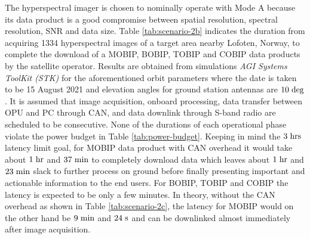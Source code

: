The hyperspectral imager is chosen to nominally operate with Mode A because its data product is a good compromise between spatial resolution, spectral resolution, SNR and data size. Table \ref{tab:scenario-2b} indicates the duration from acquiring 1334 hyperspectral images of a target area nearby Lofoten, Norway, to complete the download of a MOBIP, BOBIP, TOBIP and COBIP data products by the satellite operator. Results are obtained from simulations \emph{AGI Systems ToolKit (STK)} for the aforementioned orbit parameters where the date is taken to be 15 August 2021 and elevation angles for ground station antennas are $10 \hspace{3pt} \rm{deg}$. It is assumed that image acquisition, onboard processing, data transfer between OPU and PC through CAN, and data downlink through S-band radio are scheduled to be consecutive. None of the durations of each operational phase violate the power budget in Table \ref{tab:power-budget}. Keeping in mind the $3 \hspace{3pt} \rm{hrs}$ latency limit goal, for MOBIP data product with CAN overhead it would take about $1 \hspace{3pt} \rm{hr}$ and $37 \hspace{3pt} \rm{min}$ to completely download data which leaves about $1 \hspace{3pt} \rm{hr}$ and $23 \hspace{3pt} \rm{min}$ slack to further process on ground before finally presenting important and actionable information to the end users. For BOBIP, TOBIP and COBIP the latency is expected to be only a few minutes. In theory, without the CAN overhead as shown in Table \ref{tab:scenario-2c}, the latency for MOBIP would on the other hand be $9 \hspace{3pt} \rm{min}$ and $24 \hspace{3pt} \rm{s}$ and can be downlinked almost immediately after image acquisition.
